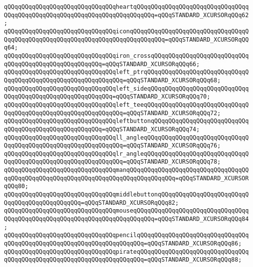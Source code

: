 \verb|qQQqqQQqqQQqqQQqqQQqqQQqqQQqqQQqheartqQQqqQQqqQQqqQQqqQQqqQQqqQQqqQQqqQQqqQQqqQQqqQQqqQQqqQQqqQQqqQQqqQQqqQQqqQQq=qQQqSTANDARD_XCURSORqQQq62;|\newline
\verb|qQQqqQQqqQQqqQQqqQQqqQQqqQQqqQQqiconqQQqqQQqqQQqqQQqqQQqqQQqqQQqqQQqqQQqqQQqqQQqqQQqqQQqqQQqqQQqqQQqqQQqqQQqqQQqqQQq=qQQqSTANDARD_XCURSORqQQq64;|\newline
\verb|qQQqqQQqqQQqqQQqqQQqqQQqqQQqqQQqiron_crossqQQqqQQqqQQqqQQqqQQqqQQqqQQqqQQqqQQqqQQqqQQqqQQqqQQqqQQq=qQQqSTANDARD_XCURSORqQQq66;|\newline
\verb|qQQqqQQqqQQqqQQqqQQqqQQqqQQqqQQqleft_ptrqQQqqQQqqQQqqQQqqQQqqQQqqQQqqQQqqQQqqQQqqQQqqQQqqQQqqQQqqQQqqQQq=qQQqSTANDARD_XCURSORqQQq68;|\newline
\verb|qQQqqQQqqQQqqQQqqQQqqQQqqQQqqQQqleft_sideqQQqqQQqqQQqqQQqqQQqqQQqqQQqqQQqqQQqqQQqqQQqqQQqqQQqqQQqqQQq=qQQqSTANDARD_XCURSORqQQq70;|\newline
\verb|qQQqqQQqqQQqqQQqqQQqqQQqqQQqqQQqleft_teeqQQqqQQqqQQqqQQqqQQqqQQqqQQqqQQqqQQqqQQqqQQqqQQqqQQqqQQqqQQqqQQq=qQQqSTANDARD_XCURSORqQQq72;|\newline
\verb|qQQqqQQqqQQqqQQqqQQqqQQqqQQqqQQqleftbuttonqQQqqQQqqQQqqQQqqQQqqQQqqQQqqQQqqQQqqQQqqQQqqQQqqQQqqQQq=qQQqSTANDARD_XCURSORqQQq74;|\newline
\verb|qQQqqQQqqQQqqQQqqQQqqQQqqQQqqQQqll_angleqQQqqQQqqQQqqQQqqQQqqQQqqQQqqQQqqQQqqQQqqQQqqQQqqQQqqQQqqQQqqQQq=qQQqSTANDARD_XCURSORqQQq76;|\newline
\verb|qQQqqQQqqQQqqQQqqQQqqQQqqQQqqQQqlr_angleqQQqqQQqqQQqqQQqqQQqqQQqqQQqqQQqqQQqqQQqqQQqqQQqqQQqqQQqqQQqqQQq=qQQqSTANDARD_XCURSORqQQq78;|\newline
\verb|qQQqqQQqqQQqqQQqqQQqqQQqqQQqqQQqmanqQQqqQQqqQQqqQQqqQQqqQQqqQQqqQQqqQQqqQQqqQQqqQQqqQQqqQQqqQQqqQQqqQQqqQQqqQQqqQQqqQQq=qQQqSTANDARD_XCURSORqQQq80;|\newline
\verb|qQQqqQQqqQQqqQQqqQQqqQQqqQQqqQQqmiddlebuttonqQQqqQQqqQQqqQQqqQQqqQQqqQQqqQQqqQQqqQQqqQQqqQQq=qQQqSTANDARD_XCURSORqQQq82;|\newline
\verb|qQQqqQQqqQQqqQQqqQQqqQQqqQQqqQQqmouseqQQqqQQqqQQqqQQqqQQqqQQqqQQqqQQqqQQqqQQqqQQqqQQqqQQqqQQqqQQqqQQqqQQqqQQqqQQq=qQQqSTANDARD_XCURSORqQQq84;|\newline
\verb|qQQqqQQqqQQqqQQqqQQqqQQqqQQqqQQqpencilqQQqqQQqqQQqqQQqqQQqqQQqqQQqqQQqqQQqqQQqqQQqqQQqqQQqqQQqqQQqqQQqqQQqqQQq=qQQqSTANDARD_XCURSORqQQq86;|\newline
\verb|qQQqqQQqqQQqqQQqqQQqqQQqqQQqqQQqpirateqQQqqQQqqQQqqQQqqQQqqQQqqQQqqQQqqQQqqQQqqQQqqQQqqQQqqQQqqQQqqQQqqQQqqQQq=qQQqSTANDARD_XCURSORqQQq88;|\newline
